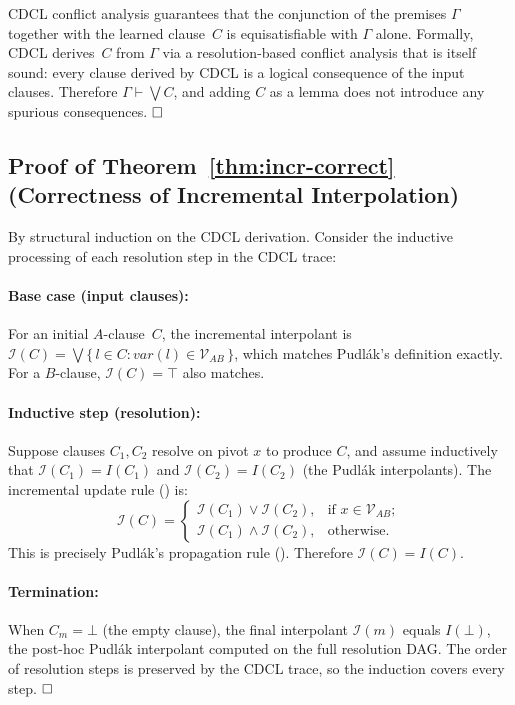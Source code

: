 \documentclass[conference]{IEEEtran}
\newcommand{\proves}{\vdash}
\begin{document}
CDCL conflict analysis guarantees that the conjunction of the premises
$\Gamma$ together with the learned clause~$C$ is equisatisfiable with
$\Gamma$ alone.  Formally, CDCL derives~$C$ from $\Gamma$ via a
resolution-based conflict analysis that is itself sound: every clause
derived by CDCL is a logical consequence of the input clauses.
Therefore $\Gamma \proves \bigvee C$, and adding $C$ as a lemma does
not introduce any spurious consequences.  $\hfill\square$

\subsection{Proof of Theorem~\ref{thm:incr-correct}
  (Correctness of Incremental Interpolation)}

By structural induction on the CDCL derivation.  Consider the
inductive processing of each resolution step in the CDCL trace:

\paragraph{Base case (input clauses):}
For an initial $A$-clause~$C$, the incremental interpolant is
$\mathcal{I}(C) = \bigvee\{\,l \in C : \mathit{var}(l) \in
  \mathcal{V}_{AB}\,\}$, which matches Pudl\'{a}k's definition
exactly.  For a $B$-clause, $\mathcal{I}(C) = \top$ also matches.

\paragraph{Inductive step (resolution):}
Suppose clauses $C_1, C_2$ resolve on pivot $x$ to produce $C$,
and assume inductively that
$\mathcal{I}(C_1) = I(C_1)$ and $\mathcal{I}(C_2) = I(C_2)$
(the Pudl\'{a}k interpolants).  The incremental update rule
() is:
\[
  \mathcal{I}(C) =
  \begin{cases}
    \mathcal{I}(C_1) \lor \mathcal{I}(C_2),
      & \text{if } x \in \mathcal{V}_{AB}; \\
    \mathcal{I}(C_1) \land \mathcal{I}(C_2),
      & \text{otherwise}.
  \end{cases}
\]
This is precisely Pudl\'{a}k's propagation rule
().  Therefore
$\mathcal{I}(C) = I(C)$.

\paragraph{Termination:} When $C_m = \bot$ (the empty clause),
the final interpolant $\mathcal{I}(m)$ equals $I(\bot)$, the post-hoc
Pudl\'{a}k interpolant computed on the full resolution DAG.  The order
of resolution steps is preserved by the CDCL trace, so the induction
covers every step.  $\hfill\square$
\end{document}
